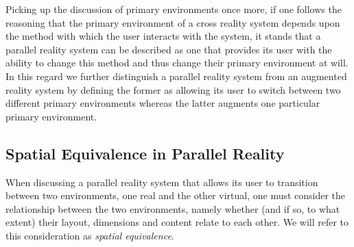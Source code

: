 
Picking up the discussion of primary environments once more, if one follows the reasoning that the primary environment of a cross reality system depends upon the method with which the user interacts with the system, it stands that a parallel reality system can be described as one that provides its user with the ability to change this method and thus change their primary environment at will. In this regard we further distinguish a parallel reality system from an augmented reality system by defining the former as allowing its user to switch between two different primary environments whereas the latter augments one particular primary environment.


\subsection{Spatial Equivalence in Parallel Reality}

\label{spatial-equivalence}

\newcommand{\turklevrfootnote}{\footnote{\textit{``For virtual reality to be interesting it has to emulate the real. But you have to be able to do something in the virtual that you couldn't in the real.''}~\cite{Turkle1997}}}

When discussing a parallel reality system that allows its user to transition between two environments, one real and the other virtual, one must consider the relationship between the two environments, namely whether (and if so, to what extent) their layout, dimensions and content relate to each other. We will refer to this consideration as \textit{spatial equivalence}.

